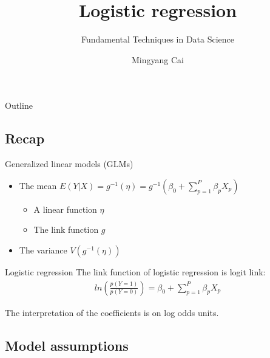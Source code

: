 \documentclass[10pt]{beamer}\usepackage[]{graphicx}\usepackage[]{xcolor}
\title{Logistic regression}
\subtitle{Fundamental Techniques in Data Science}
\author{Mingyang Cai}
\institute{Department of Methodology \& Statistics\\Utrecht University}
\date{}
\begin{document}
\begin{frame}[t, plain]
  \titlepage
\end{frame}


\begin{frame}{Outline}
  \tableofcontents
\end{frame}


\subsection{Recap}


\begin{frame}{Generalized linear models (GLMs)}
\begin{itemize}
\item The mean $E(Y|X) = g^{-1}(\eta) = g^{-1}(\beta_0 + \sum_{p = 1}^P \beta_p X_p)$
\begin{itemize}
\item A linear function $\eta$
\item The link function $g$
\end{itemize}
\item The variance $V(g^{-1}(\eta))$
\end{itemize}
\end{frame}


\begin{frame}{Logistic regression}
The link function of logistic regression is logit link:
\begin{align*}
ln(\frac{p(Y = 1)}{p(Y=0)}) = \beta_0 + \sum_{p = 1}^P \beta_p X_p
\end{align*}

The interpretation of the coefficients is on log odds units.
\end{frame}


\subsection{Model assumptions}
\end{document}
